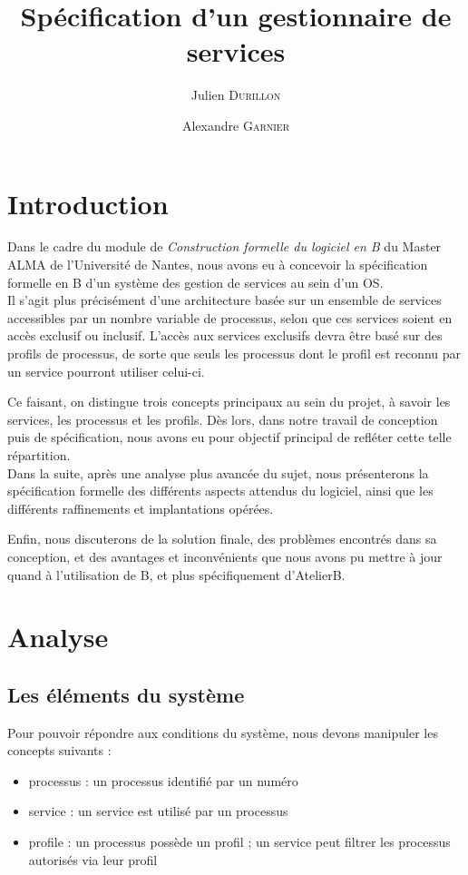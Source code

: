 \documentclass[french, 11pt, a4paper]{article}
\author{Julien \textsc{Durillon} \and Alexandre \textsc{Garnier}}
\title{Spécification d'un gestionnaire de services}
\begin{document}
\maketitle

\section{Introduction}

Dans le cadre du module de \emph{Construction formelle du logiciel en B} du
Master ALMA de l'Université de Nantes, nous avons eu à concevoir la
spécification formelle en B d'un système des gestion de services au sein d'un
OS.\\

Il s'agit plus précisément d'une architecture basée sur un ensemble de services
accessibles par un nombre variable de processus, selon que ces services soient
en accès exclusif ou inclusif. L'accès aux services exclusifs devra être basé
sur des profils de processus, de sorte que seuls les processus dont le profil
est reconnu par un service pourront utiliser celui-ci.

Ce faisant, on distingue trois concepts principaux au sein du projet, à savoir
les services, les processus et les profils. Dès lors, dans notre travail de
conception puis de spécification, nous avons eu pour objectif principal de
refléter cette telle répartition.\\

Dans la suite, après une analyse plus avancée du sujet, nous présenterons la
spécification formelle des différents aspects attendus du logiciel, ainsi que
les différents raffinements et implantations opérées.

Enfin, nous discuterons de la solution finale, des problèmes encontrés dans sa
conception, et des avantages et inconvénients que nous avons pu mettre à jour
quand à l'utilisation de B, et plus spécifiquement d'AtelierB.

\section{Analyse}

    \subsection{Les éléments du système}
        Pour pouvoir répondre aux conditions du système, nous devons manipuler les concepts suivants :

        \begin{itemize}
            \item processus : un processus identifié par un numéro
            \item service : un service est utilisé par un processus
            \item profile : un processus possède un profil ; un service peut filtrer les processus autorisés via leur profil
        \end{itemize}
\end{document}
